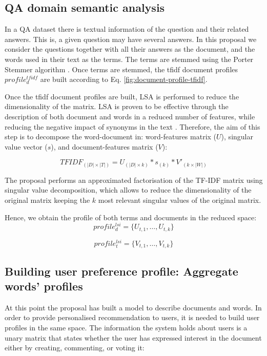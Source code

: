 \documentclass[preprint]{elsarticle}
\begin{document}
\begin{spacing}{1.5}
\subsection{QA domain semantic analysis}

In a QA dataset there is textual information of the question and their related answers. This is, a given question may have several answers. In this proposal we consider the questions together with all their answers as the document, and the words used in their text as the terms. The terms are stemmed using the Porter Stemmer algorithm \citep{Porter1980}. Once terms are stemmed, the tfidf document profiles $profile^{tfidf}_{d}$ are built according to Eq. \ref{fig:document-profile-tfidf}.

Once the tfidf document profiles are built, LSA is performed to reduce the dimensionality of the matrix. LSA is proven to be effective through the description of both document and words in a reduced number of features, while reducing the negative impact of synonyms in the text \cite{}. Therefore, the aim of this step is to decompose the word-document in: word-features matrix ($U$), singular value vector ($s$), and document-features matrix ($V$):

\begin{equation}
	TFIDF_{(|D|\times|T|)} = U_{(|D|\times k)} * s_{(k)} * V'_{(k \times |W|)}
\end{equation}

The proposal performs an approximated factorisation of the TF-IDF matrix using singular value decomposition, which allows to reduce the dimensionality of the original matrix keeping the $k$ most relevant singular values of the original matrix.

Hence, we obtain the profile of both terms and documents in the reduced space:
\begin{equation}
	profile^{lsi}_d = \{ U_{t,1},\dots, U_{t,k}\}
\end{equation}

\begin{equation}
	profile^{lsi}_t = \{ V_{t,1},\dots, V_{t,k}\}
\end{equation}

\subsection{Building user preference profile: Aggregate words' profiles}

At this point the proposal has built a model to describe documents and words. In order to provide personalised recommendation to users, it is needed to build user profiles in the same space. The information the system holds about users is a unary matrix that states whether the user has expressed interest in the document either by creating, commenting, or voting it:


\end{spacing}
\end{document}

